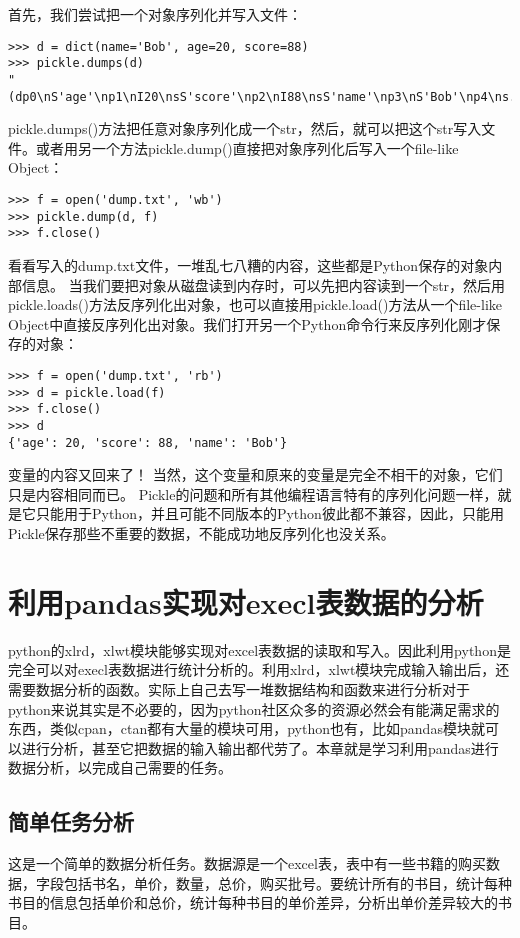 \documentclass[twoside,11pt]{book}
\begin{document}
首先，我们尝试把一个对象序列化并写入文件：
\begin{lstlisting}
>>> d = dict(name='Bob', age=20, score=88)
>>> pickle.dumps(d)
"(dp0\nS'age'\np1\nI20\nsS'score'\np2\nI88\nsS'name'\np3\nS'Bob'\np4\ns."
\end{lstlisting}

pickle.dumps()方法把任意对象序列化成一个str，然后，就可以把这个str写入文件。或者用另一个方法pickle.dump()直接把对象序列化后写入一个file-like Object：
\begin{lstlisting}
>>> f = open('dump.txt', 'wb')
>>> pickle.dump(d, f)
>>> f.close()
\end{lstlisting}

看看写入的dump.txt文件，一堆乱七八糟的内容，这些都是Python保存的对象内部信息。
当我们要把对象从磁盘读到内存时，可以先把内容读到一个str，然后用pickle.loads()方法反序列化出对象，也可以直接用pickle.load()方法从一个file-like Object中直接反序列化出对象。我们打开另一个Python命令行来反序列化刚才保存的对象：
\begin{lstlisting}
>>> f = open('dump.txt', 'rb')
>>> d = pickle.load(f)
>>> f.close()
>>> d
{'age': 20, 'score': 88, 'name': 'Bob'}
\end{lstlisting}

变量的内容又回来了！
当然，这个变量和原来的变量是完全不相干的对象，它们只是内容相同而已。
Pickle的问题和所有其他编程语言特有的序列化问题一样，就是它只能用于Python，并且可能不同版本的Python彼此都不兼容，因此，只能用Pickle保存那些不重要的数据，不能成功地反序列化也没关系。

\chapter{利用pandas实现对execl表数据的分析}

python的xlrd，xlwt模块能够实现对excel表数据的读取和写入。因此利用python是完全可以对execl表数据进行统计分析的。利用xlrd，xlwt模块完成输入输出后，还需要数据分析的函数。实际上自己去写一堆数据结构和函数来进行分析对于python来说其实是不必要的，因为python社区众多的资源必然会有能满足需求的东西，类似cpan，ctan都有大量的模块可用，python也有，比如pandas模块就可以进行分析，甚至它把数据的输入输出都代劳了。本章就是学习利用pandas进行数据分析，以完成自己需要的任务。

\section{简单任务分析}
这是一个简单的数据分析任务。数据源是一个excel表，表中有一些书籍的购买数据，字段包括书名，单价，数量，总价，购买批号。要统计所有的书目，统计每种书目的信息包括单价和总价，统计每种书目的单价差异，分析出单价差异较大的书目。
\end{document}
